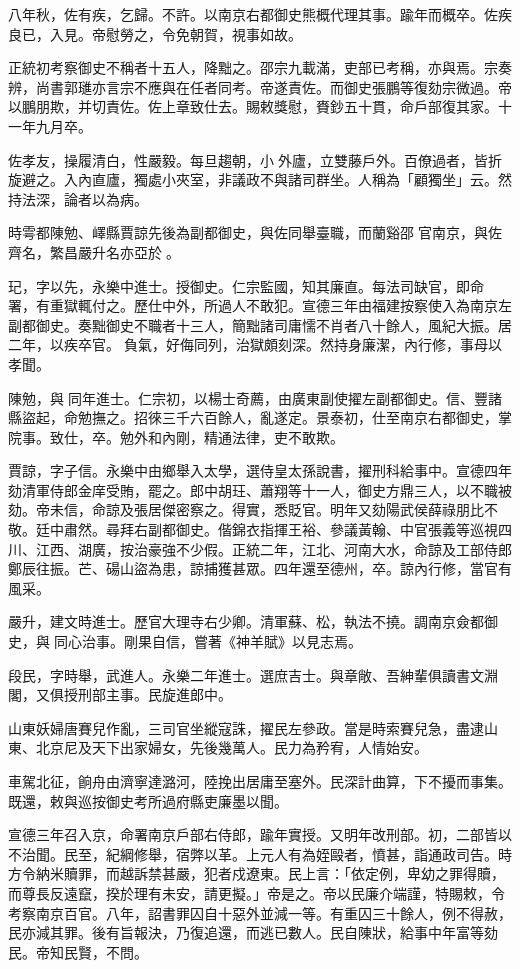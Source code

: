 \begin{pinyinscope}
八年秋，佐有疾，乞歸。不許。以南京右都御史熊概代理其事。踰年而概卒。佐疾良已，入見。帝慰勞之，令免朝賀，視事如故。

正統初考察御史不稱者十五人，降黜之。邵宗九載滿，吏部已考稱，亦與焉。宗奏辨，尚書郭璡亦言宗不應與在任者同考。帝遂責佐。而御史張鵬等復劾宗微過。帝以鵬朋欺，并切責佐。佐上章致仕去。賜敕獎慰，賚鈔五十貫，命戶部復其家。十一年九月卒。

佐孝友，操履清白，性嚴毅。每旦趨朝，小外廬，立雙藤戶外。百僚過者，皆折旋避之。入內直廬，獨處小夾室，非議政不與諸司群坐。人稱為「顧獨坐」云。然持法深，論者以為病。

時雩都陳勉、嶧縣賈諒先後為副都御史，與佐同舉臺職，而蘭谿邵官南京，與佐齊名，繁昌嚴升名亦亞於。

玘，字以先，永樂中進士。授御史。仁宗監國，知其廉直。每法司缺官，即命署，有重獄輒付之。歷仕中外，所過人不敢犯。宣德三年由福建按察使入為南京左副都御史。奏黜御史不職者十三人，簡黜諸司庸懦不肖者八十餘人，風紀大振。居二年，以疾卒官。負氣，好侮同列，治獄頗刻深。然持身廉潔，內行修，事母以孝聞。

陳勉，與同年進士。仁宗初，以楊士奇薦，由廣東副使擢左副都御史。信、豐諸縣盜起，命勉撫之。招徠三千六百餘人，亂遂定。景泰初，仕至南京右都御史，掌院事。致仕，卒。勉外和內剛，精通法律，吏不敢欺。

賈諒，字子信。永樂中由鄉舉入太學，選侍皇太孫說書，擢刑科給事中。宣德四年劾清軍侍郎金庠受賄，罷之。郎中胡玨、蕭翔等十一人，御史方鼎三人，以不職被劾。帝未信，命諒及張居傑密察之。得實，悉貶官。明年又劾陽武侯薛祿朋比不敬。廷中肅然。尋拜右副都御史。偕錦衣指揮王裕、參議黃翰、中官張義等巡視四川、江西、湖廣，按治豪強不少假。正統二年，江北、河南大水，命諒及工部侍郎鄭辰往振。芒、碭山盜為患，諒捕獲甚眾。四年還至德州，卒。諒內行修，當官有風采。

嚴升，建文時進士。歷官大理寺右少卿。清軍蘇、松，執法不撓。調南京僉都御史，與同心治事。剛果自信，嘗著《神羊賦》以見志焉。

段民，字時舉，武進人。永樂二年進士。選庶吉士。與章敞、吾紳輩俱讀書文淵閣，又俱授刑部主事。民旋進郎中。

山東妖婦唐賽兒作亂，三司官坐縱寇誅，擢民左參政。當是時索賽兒急，盡逮山東、北京尼及天下出家婦女，先後幾萬人。民力為矜宥，人情始安。

車駕北征，餉舟由濟寧達潞河，陸挽出居庸至塞外。民深計曲算，下不擾而事集。既還，敕與巡按御史考所過府縣吏廉墨以聞。

宣德三年召入京，命署南京戶部右侍郎，踰年實授。又明年改刑部。初，二部皆以不治聞。民至，紀綱修舉，宿弊以革。上元人有為姪毆者，憤甚，詣通政司告。時方令納米贖罪，而越訴禁甚嚴，犯者戍遼東。民上言：「依定例，卑幼之罪得贖，而尊長反遠竄，揆於理有未安，請更擬。」帝是之。帝以民廉介端謹，特賜敕，令考察南京百官。八年，詔書罪囚自十惡外並減一等。有重囚三十餘人，例不得赦，民亦減其罪。後有旨報決，乃復追還，而逃已數人。民自陳狀，給事中年富等劾民。帝知民賢，不問。


\end{pinyinscope}
